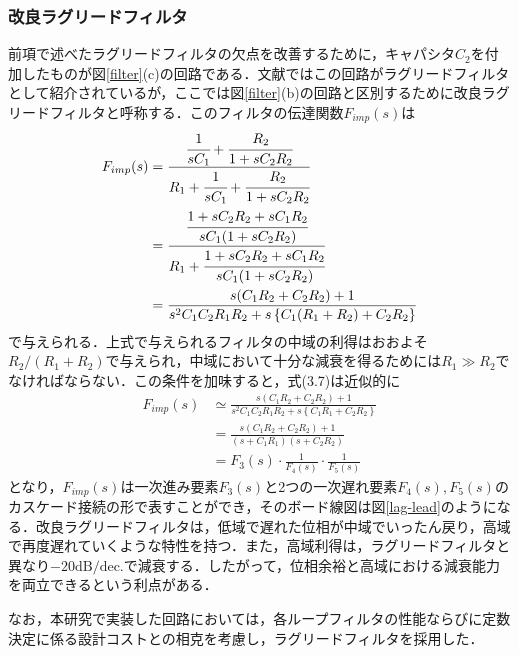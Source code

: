 \subsubsection{改良ラグリードフィルタ}
前項で述べたラグリードフィルタの欠点を改善するために，キャパシタ$C_2$を付加したものが図\ref{filter}(c)の回路である．文献\cite{Enzaka2014}ではこの回路がラグリードフィルタとして紹介されているが，ここでは図\ref{filter}(b)の回路と区別するために改良ラグリードフィルタと呼称する．このフィルタの伝達関数$F_{imp}(s)$は
\newpage
\begin{align}
F_{imp}(s) &= \frac{\cfrac{1}{sC_1}+\cfrac{R_2}{1+sC_2R_2}}{R_1+\cfrac{1}{sC_1}+\cfrac{R_2}{1+sC_2R_2}} \\
&=\frac{\cfrac{1+sC_2R_2+sC_1R_2}{sC_1(1+sC_2R_2)}}{R_1+\cfrac{1+sC_2R_2+sC_1R_2}{sC_1(1+sC_2R_2)}} \\ 
&=\frac{s(C_1R_2+C_2R_2)+1}{s^2 C_1C_2R_1R_2+s\left\{C_1(R_1+R_2)+C_2R_2 \right\}}
\end{align}
で与えられる．上式で与えられるフィルタの中域の利得はおおよそ$R_2/(R_1+R_2)$で与えられ，中域において十分な減衰を得るためには$R_1 \gg R_2$でなければならない．この条件を加味すると，式(3.7)は近似的に
\begin{align}
F_{imp}(s) & \simeq \frac{s(C_1R_2+C_2R_2)+1}{s^2 C_1C_2R_1R_2+s\left\{C_1R_1+C_2R_2 \right\}} \\
&=\frac{s(C_1R_2+C_2R_2)+1}{(s+C_1R_1)(s+C_2R_2)} \\
&=F_3(s)\cdot \frac{1}{F_4(s)} \cdot \frac{1}{F_5(s)}
\end{align}
となり，$F_{imp}(s)$は一次進み要素$F_3(s)$と2つの一次遅れ要素$F_4(s),F_5(s)$のカスケード接続の形で表すことができ，そのボード線図は図\ref{lag-lead}のようになる．改良ラグリードフィルタは，低域で遅れた位相が中域でいったん戻り，高域で再度遅れていくような特性を持つ．また，高域利得は，ラグリードフィルタと異なり$\mathrm{-20 dB/dec.}$で減衰する．したがって，位相余裕と高域における減衰能力を両立できるという利点がある．\par 
なお，本研究で実装した回路においては，各ループフィルタの性能ならびに定数決定に係る設計コストとの相克を考慮し，ラグリードフィルタを採用した．


